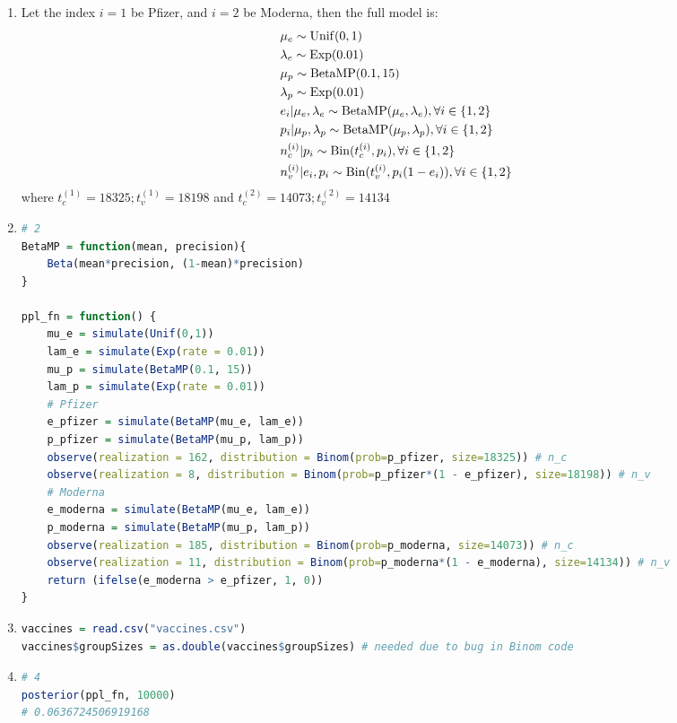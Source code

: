 \documentclass{article}
\begin{document}



\begin{enumerate}
\item
Let the index $i = 1$ be Pfizer, and $i = 2$ be Moderna, then the full model is:
\begin{align*}
& \mu_e \sim \operatorname{Unif}(0,1)\\
& \lambda_e \sim \operatorname{Exp}(0.01)\\
& \mu_p \sim \operatorname{BetaMP}(0.1, 15)\\
& \lambda_p \sim \operatorname{Exp}(0.01)\\
& e_i|\mu_e, \lambda_e \sim \operatorname{BetaMP}(\mu_e, \lambda_e), \forall i \in \{1, 2\}\\
& p_i|\mu_p, \lambda_p \sim \operatorname{BetaMP}(\mu_p, \lambda_p), \forall i \in \{1, 2\}\\
& n_c^{(i)}|p_i \sim \operatorname{Bin}(t_c^{(i)}, p_i), \forall i \in \{1, 2\}\\
& n_v^{(i)}|e_i, p_i \sim \operatorname{Bin}(t_v^{(i)}, p_i(1-e_i)), \forall i \in \{1, 2\}
\end{align*}
where $t_c^{(1)} = 18325; t_v^{(1)} = 18198$ and $t_c^{(2)} = 14073; t_v^{(2)} = 14134$


\item 
\begin{lstlisting}[language=R]
# 2
BetaMP = function(mean, precision){
    Beta(mean*precision, (1-mean)*precision)
}

ppl_fn = function() {
    mu_e = simulate(Unif(0,1))
    lam_e = simulate(Exp(rate = 0.01))
    mu_p = simulate(BetaMP(0.1, 15))
    lam_p = simulate(Exp(rate = 0.01))
    # Pfizer
    e_pfizer = simulate(BetaMP(mu_e, lam_e))
    p_pfizer = simulate(BetaMP(mu_p, lam_p))
    observe(realization = 162, distribution = Binom(prob=p_pfizer, size=18325)) # n_c
    observe(realization = 8, distribution = Binom(prob=p_pfizer*(1 - e_pfizer), size=18198)) # n_v
    # Moderna
    e_moderna = simulate(BetaMP(mu_e, lam_e))
    p_moderna = simulate(BetaMP(mu_p, lam_p))
    observe(realization = 185, distribution = Binom(prob=p_moderna, size=14073)) # n_c
    observe(realization = 11, distribution = Binom(prob=p_moderna*(1 - e_moderna), size=14134)) # n_v
    return (ifelse(e_moderna > e_pfizer, 1, 0))
}
\end{lstlisting}


\item 
\begin{lstlisting}[language=R]
vaccines = read.csv("vaccines.csv")
vaccines$groupSizes = as.double(vaccines$groupSizes) # needed due to bug in Binom code
\end{lstlisting}


\item 
\begin{lstlisting}[language=R]
# 4
posterior(ppl_fn, 10000)
# 0.0636724506919168
\end{lstlisting}


\end{enumerate}












 
\end{document}
